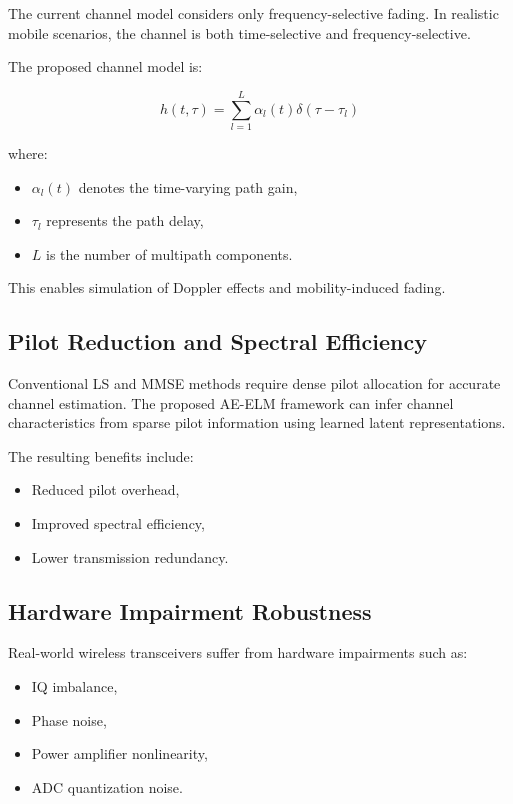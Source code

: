 \documentclass[10pt, conference]{IEEEtran}
\begin{document}
The current channel model considers only frequency-selective fading. In realistic mobile scenarios, the channel is both time-selective and frequency-selective.

The proposed channel model is:

\[
h(t,\tau)
=
\sum_{l=1}^{L}
\alpha_l(t)\delta(\tau - \tau_l)
\]

where:
\begin{itemize}
    \item $\alpha_l(t)$ denotes the time-varying path gain,
    \item $\tau_l$ represents the path delay,
    \item $L$ is the number of multipath components.
\end{itemize}

This enables simulation of Doppler effects and mobility-induced fading.

\subsection{Pilot Reduction and Spectral Efficiency}

Conventional LS and MMSE methods require dense pilot allocation for accurate channel estimation. The proposed AE-ELM framework can infer channel characteristics from sparse pilot information using learned latent representations.

The resulting benefits include:

\begin{itemize}
    \item Reduced pilot overhead,
    \item Improved spectral efficiency,
    \item Lower transmission redundancy.
\end{itemize}

\subsection{Hardware Impairment Robustness}

Real-world wireless transceivers suffer from hardware impairments such as:

\begin{itemize}
    \item IQ imbalance,
    \item Phase noise,
    \item Power amplifier nonlinearity,
    \item ADC quantization noise.
\end{itemize}
\end{document}
